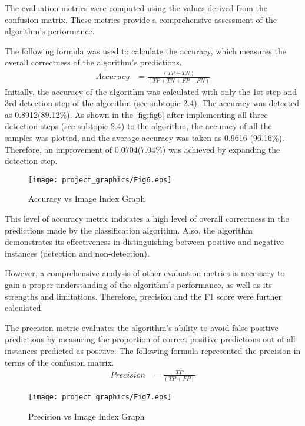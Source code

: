 \documentclass[]{iat}
\begin{document}
The evaluation metrics were computed using the values derived from the confusion matrix. These metrics provide a comprehensive assessment of the algorithm's performance. 
\par
The following formula was used to calculate the accuracy, which measures the overall correctness of the algorithm's predictions.
\FloatBarrier
\begin{align}
Accuracy &=\frac{(TP+TN)}{(TP+TN+FP+FN)}
\end{align}
Initially, the accuracy of the algorithm was calculated with only the 1st step and 3rd detection step of the algorithm (see subtopic 2.4). The accuracy was detected as 0.8912(89.12\%). As shown in the \autoref{fig:fig6} after implementing all three detection steps (see subtopic 2.4) to the algorithm, the accuracy of all the samples was plotted, and the average accuracy was taken as 0.9616 (96.16\%). Therefore, an improvement of 0.0704(7.04\%) was achieved by expanding the detection step. 
\FloatBarrier
\begin{figure}[h]
    
	\texttt{[image: project\_graphics/Fig6.eps]}
	\caption{Accuracy vs Image Index Graph}
	\label{fig:fig6}
\end{figure}
\par
This level of accuracy metric indicates a high level of overall correctness in the predictions made by the classification algorithm. Also, the algorithm demonstrates its effectiveness in distinguishing between positive and negative instances (detection and non-detection).
\par
However, a comprehensive analysis of other evaluation metrics is necessary to gain a proper understanding of the algorithm's performance, as well as its strengths and limitations. Therefore, precision and the F1 score were further calculated.
\par
The precision metric evaluates the algorithm's ability to avoid false positive predictions by measuring the proportion of correct positive predictions out of all instances predicted as positive. The following formula represented the precision in terms of the confusion matrix.
\FloatBarrier
\begin{align}
Precision &=\frac{TP}{(TP+FP)}
\end{align}
\FloatBarrier
\begin{figure}[h]
    
	\texttt{[image: project\_graphics/Fig7.eps]}
	\caption{Precision vs Image Index Graph}
	\label{fig:fig7}
\end{figure}
\end{document}
